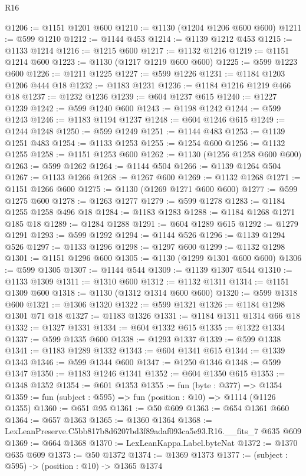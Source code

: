 \begin{lexlean}{R16}
\begin{coremodule}
@1206 := @1151 @1201 @600
@1210 := @1130 (@1204 @1206 @600 @600)
@1211 := @599 @1210
@1212 := @1144 @453
@1214 := @1139 @1212 @453
@1215 := @1133 @1214
@1216 := @1215 @600
@1217 := @1132 @1216
@1219 := @1151 @1214 @600
@1223 := @1130 (@1217 @1219 @600 @600)
@1225 := @599 @1223 @600
@1226 := @1211 @1225
@1227 := @599 @1226
@1231 := @1184 @1203 @1206 @444 @18
@1232 := @1183 @1231
@1236 := @1184 @1216 @1219 @466 @18
@1237 := @1232 @1236
@1239 := @604 @1237 @615
@1240 := @1227 @1239
@1242 := @599 @1240 @600
@1243 := @1198 @1242
@1244 := @599 @1243
@1246 := @1183 @1194 @1237
@1248 := @604 @1246 @615
@1249 := @1244 @1248
@1250 := @599 @1249
@1251 := @1144 @483
@1253 := @1139 @1251 @483
@1254 := @1133 @1253
@1255 := @1254 @600
@1256 := @1132 @1255
@1258 := @1151 @1253 @600
@1262 := @1130 (@1256 @1258 @600 @600)
@1263 := @599 @1262
@1264 := @1144 @504
@1266 := @1139 @1264 @504
@1267 := @1133 @1266
@1268 := @1267 @600
@1269 := @1132 @1268
@1271 := @1151 @1266 @600
@1275 := @1130 (@1269 @1271 @600 @600)
@1277 := @599 @1275 @600
@1278 := @1263 @1277
@1279 := @599 @1278
@1283 := @1184 @1255 @1258 @496 @18
@1284 := @1183 @1283
@1288 := @1184 @1268 @1271 @185 @18
@1289 := @1284 @1288
@1291 := @604 @1289 @615
@1292 := @1279 @1291
@1293 := @599 @1292
@1294 := @1144 @526
@1296 := @1139 @1294 @526
@1297 := @1133 @1296
@1298 := @1297 @600
@1299 := @1132 @1298
@1301 := @1151 @1296 @600
@1305 := @1130 (@1299 @1301 @600 @600)
@1306 := @599 @1305
@1307 := @1144 @544
@1309 := @1139 @1307 @544
@1310 := @1133 @1309
@1311 := @1310 @600
@1312 := @1132 @1311
@1314 := @1151 @1309 @600
@1318 := @1130 (@1312 @1314 @600 @600)
@1320 := @599 @1318 @600
@1321 := @1306 @1320
@1322 := @599 @1321
@1326 := @1184 @1298 @1301 @71 @18
@1327 := @1183 @1326
@1331 := @1184 @1311 @1314 @66 @18
@1332 := @1327 @1331
@1334 := @604 @1332 @615
@1335 := @1322 @1334
@1337 := @599 @1335 @600
@1338 := @1293 @1337
@1339 := @599 @1338
@1341 := @1183 @1289 @1332
@1343 := @604 @1341 @615
@1344 := @1339 @1343
@1346 := @599 @1344 @600
@1347 := @1250 @1346
@1348 := @599 @1347
@1350 := @1183 @1246 @1341
@1352 := @604 @1350 @615
@1353 := @1348 @1352
@1354 := @601 @1353
@1355 := fun (byte : @377) => @1354
@1359 := fun (subject : @595) => fun (position : @10) => @1114 (@1126 @1355)
@1360 := @651 @95
@1361 := @50 @609
@1363 := @654 @1361 @660
@1364 := @657 @1363
@1365 := @1360 @1364
@1368 := LexLeanPreserve.C5bb817b8d6207bd3f89adaf093ca5e93.R16.__fits_7 @635 @609
@1369 := @664 @1368
@1370 := LexLeanKappa.Label.byteNat
@1372 := @1370 @635 @609
@1373 := @50 @1372
@1374 := @1369 @1373
@1377 := (subject : @595) -> (position : @10) -> @1365 @1374

\end{coremodule}
\end{lexlean}
